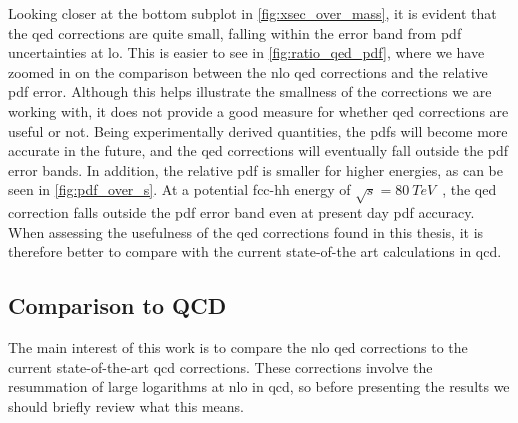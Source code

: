 Looking closer at the bottom subplot in \cref{fig:xsec_over_mass}, it is evident that the \gls{qed} corrections are quite small, falling within the error band from \gls{pdf} uncertainties at \gls{lo}.
This is easier to see in \cref{fig:ratio_qed_pdf}, where we have zoomed in on the comparison between the \gls{nlo} \gls{qed} corrections and the relative \gls{pdf} error.
Although this helps illustrate the smallness of the corrections we are working with, it does not provide a good measure for whether \gls{qed} corrections are useful or not.
Being experimentally derived quantities, the \glspl{pdf} will become more accurate in the future, and the \gls{qed} corrections will eventually fall outside the \gls{pdf} error bands.
In addition, the relative \gls{pdf} is smaller for higher energies, as can be seen in \cref{fig:pdf_over_s}.
At a potential \gls{fcc}-hh energy of $\sqrt{s}=\qty{80}{TeV}$~\cite{FCC:2025lpp}, the \gls{qed} correction falls outside the \gls{pdf} error band even at present day \gls{pdf} accuracy.
When assessing the usefulness of the \gls{qed} corrections found in this thesis, it is therefore better to compare with the current state-of-the art calculations in \gls{qcd}.




\subsection{Comparison to QCD}

The main interest of this work is to compare the \gls{nlo} \gls{qed} corrections to the current state-of-the-art \gls{qcd} corrections.
These corrections involve the resummation of large logarithms at \gls{nlo} in \gls{qcd}, so before presenting the results we should briefly review what this means.

